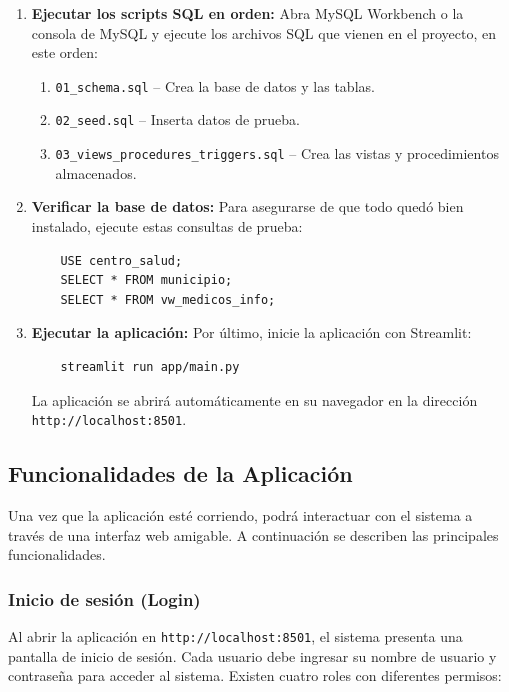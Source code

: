 \documentclass[12pt,a4paper]{article}
\begin{document}
\begin{enumerate}
    \item \textbf{Ejecutar los scripts SQL en orden:} Abra MySQL Workbench o la consola de MySQL y ejecute los archivos SQL que vienen en el proyecto, en este orden:
    \begin{enumerate}
        \item \texttt{01\_schema.sql} -- Crea la base de datos y las tablas.
        \item \texttt{02\_seed.sql} -- Inserta datos de prueba.
        \item \texttt{03\_views\_procedures\_triggers.sql} -- Crea las vistas y procedimientos almacenados.
    \end{enumerate}

    \item \textbf{Verificar la base de datos:} Para asegurarse de que todo qued\'o bien instalado, ejecute estas consultas de prueba:
    {\small\begin{verbatim}
    USE centro_salud;
    SELECT * FROM municipio;
    SELECT * FROM vw_medicos_info;
    \end{verbatim}}

    \item \textbf{Ejecutar la aplicaci\'on:} Por \'ultimo, inicie la aplicaci\'on con Streamlit:
    {\small\begin{verbatim}
    streamlit run app/main.py
    \end{verbatim}}
    La aplicaci\'on se abrir\'a autom\'aticamente en su navegador en la direcci\'on \texttt{http://localhost:8501}.

\end{enumerate}

\subsection{Funcionalidades de la Aplicaci\'on}

Una vez que la aplicaci\'on est\'e corriendo, podr\'a interactuar con el sistema a trav\'es de una interfaz web amigable. A continuaci\'on se describen las principales funcionalidades.

\subsubsection{Inicio de sesi\'on (Login)}
Al abrir la aplicaci\'on en \texttt{http://localhost:8501}, el sistema presenta una pantalla de inicio de sesi\'on. Cada usuario debe ingresar su nombre de usuario y contrase\~na para acceder al sistema. Existen cuatro roles con diferentes permisos:
\end{document}
